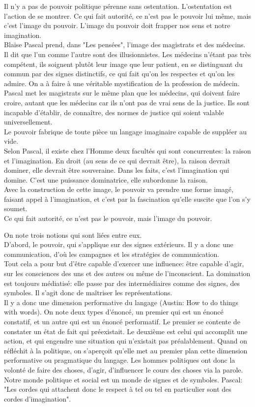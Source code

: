 \documentclass[10pt, a4paper, openany]{book}
\begin{document}
Il n'y a pas de pouvoir politique pérenne sans ostentation. L'ostentation est l'action de se montrer. Ce qui fait autorité, ce n'est pas le pouvoir lui même, mais c'est l'image du pouvoir. L'image du pouvoir doit frapper nos sens et notre imagination. \\
Blaise Pascal prend, dans "Les pensées", l'image des magistrats et des médecins. Il dit que l'un comme l'autre sont des illusionnistes. Les médecins n'étant pas très compétent, ils soignent plutôt leur image que leur patient, en se distinguant du commun par des signes distinctifs, ce qui fait qu'on les respectes et qu'on les admire. On a à faire à une véritable mystification de la profession de médecin. \\
Pascal met les magistrats sur le même plan que les médecins, qui doivent faire croire, autant que les médecins car ils n'ont pas de vrai sens de la justice. Ils sont incapable d'établir, de connaître, des normes de justice qui soient valable universellement. \\
Le pouvoir fabrique de toute pièce un langage imaginaire capable de suppléer au vide. \\
Selon Pascal, il existe chez l'Homme deux facultés qui sont concurrentes: la raison et l'imagination. En droit (au sens de ce qui devrait être), la raison devrait dominer, elle devrait être souveraine. Dans les faits, c'est l'imagination qui domine. C'est une puissance dominatrice, elle subordonne la raison. \\
Avec la construction de cette image, le pouvoir va prendre une forme imagé, faisant appel à l'imagination, et c'est par la fascination qu'elle suscite que l'on s'y soumet. \\
Ce qui fait autorité, ce n'est pas le pouvoir, mais l'image du pouvoir.


On note trois notions qui sont liées entre eux. \\
D'abord, le pouvoir, qui s'applique sur des signes extérieurs. Il y a donc une communication, d'où les campagnes et les stratégies de communication. \\
Tout cela a pour but d'être capable d'exercer une influence: être capable d'agir, sur les consciences des uns et des autres ou même de l'inconscient. La domination est toujours médiatisé: elle passe par des intermédiaires comme des signes, des symboles. Il s'agit donc de maîtriser les représentations. \\
Il y a donc une dimension performative du langage (Austin: How to do things with words). On note deux types d'énoncé, un premier qui est un énoncé constatif, et un autre qui est un énoncé performatif. Le premier se contente de constater un état de fait qui préexistait. Le deuxième est celui qui accomplit une action, et qui engendre une situation qui n'existait pas préalablement. Quand on réfléchit à la politique, on s'aperçoit qu'elle met au premier plan cette dimension performative ou pragmatique du langage. Les hommes politiques ont donc la volonté de faire des choses, d'agir, d'influencer le cours des choses via la parole. \\
Notre monde politique et social est un monde de signes et de symboles. Pascal: "Les cordes qui attachent donc le respect à tel ou tel en particulier sont des cordes d'imagination". 
\end{document}
